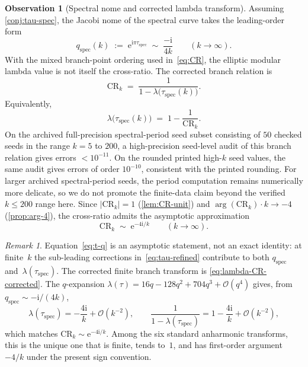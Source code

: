 \documentclass[11pt,a4paper]{article}
\theoremstyle{plain}
\theoremstyle{definition}
\newtheorem{observation}[theorem]{Observation}
\theoremstyle{remark}
\newtheorem{remark}[theorem]{Remark}
\newcommand{\ee}{\mathrm{e}}
\newcommand{\ii}{\mathrm{i}}
\newcommand{\Oo}{\mathcal{O}}
\begin{document}
\begin{observation}[Spectral nome and corrected lambda transform]
\label{cor:q-spec}
Assuming \cref{conj:tau-spec}, the Jacobi nome of the spectral curve
takes the leading-order form
\begin{equation}\label{eq:q-spec}
  q_{\mathrm{spec}}(k)
  \;:=\; \ee^{\ii\pi\tau_{\mathrm{spec}}}
  \;\sim\; \frac{-\ii}{4k}
  \qquad (k \to \infty).
\end{equation}
With the mixed branch-point ordering used in~\eqref{eq:CR}, the elliptic
modular lambda value is not itself the cross-ratio.  The corrected branch
relation is
\begin{equation}\label{eq:lambda-CR-corrected}
  \mathrm{CR}_k
  \;=\;
  \frac{1}{1-\lambda\!\bigl(\tau_{\mathrm{spec}}(k)\bigr)}.
\end{equation}
Equivalently,
\begin{equation}\label{eq:lambda-from-CR}
  \lambda\!\bigl(\tau_{\mathrm{spec}}(k)\bigr)
  \;=\; 1 - \frac{1}{\mathrm{CR}_k}.
\end{equation}
On the archived full-precision spectral-period seed subset consisting of
$50$ checked seeds in the range $k=5$ to $200$, a high-precision
seed-level audit of this branch relation
gives errors $<10^{-11}$.  On the rounded printed high-$k$ seed values, the
same audit gives errors of order $10^{-10}$, consistent with the printed
rounding.  For larger archived spectral-period seeds, the period computation
remains numerically more delicate, so we do not promote the finite-data claim
beyond the verified $k\le 200$ range here.
Since $\lvert\mathrm{CR}_k\rvert = 1$ (\cref{lem:CR-unit})
and $\arg(\mathrm{CR}_k) \cdot k \to -4$ (\cref{prop:arg-4}),
the cross-ratio admits the asymptotic approximation
\begin{equation}\label{eq:t-q}
  \mathrm{CR}_k
  \;\sim\; \ee^{-4\ii/k}
  \qquad (k \to \infty).
\end{equation}
\end{observation}
\begin{remark}
  Equation~\eqref{eq:t-q} is an asymptotic statement, not an
  exact identity: at finite~$k$ the sub-leading corrections
  in~\eqref{eq:tau-refined} contribute to both
  $q_{\mathrm{spec}}$ and~$\lambda(\tau_{\mathrm{spec}})$.
  The corrected finite branch transform is
  \eqref{eq:lambda-CR-corrected}.  The $q$-expansion
  $\lambda(\tau)=16q-128q^2+704q^3+\Oo(q^4)$ gives, from
  $q_{\mathrm{spec}}\sim -\ii/(4k)$,
  \[
    \lambda(\tau_{\mathrm{spec}})
    = -\frac{4\ii}{k} + \Oo(k^{-2}),
    \qquad
    \frac{1}{1-\lambda(\tau_{\mathrm{spec}})}
    = 1 - \frac{4\ii}{k} + \Oo(k^{-2}),
  \]
  which matches $\mathrm{CR}_k \sim \ee^{-4\ii/k}$.  Among the six
  standard anharmonic transforms, this is the unique one that is finite,
  tends to~$1$, and has first-order argument $-4/k$ under the present
  sign convention.
\end{remark}
\end{document}
